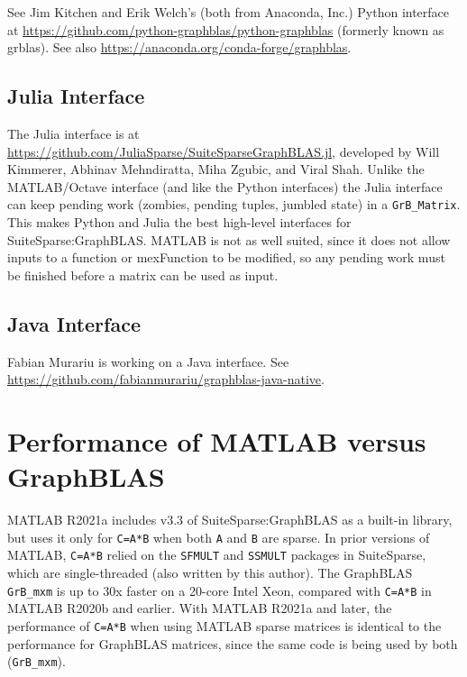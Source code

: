 \documentclass[12pt]{article}
\begin{document}
See Jim Kitchen and Erik Welch's (both from Anaconda, Inc.) Python interface at
\url{https://github.com/python-graphblas/python-graphblas} (formerly known as grblas).
See also \url{https://anaconda.org/conda-forge/graphblas}.

\subsection{Julia Interface}
\label{julia}

The Julia interface is at
\url{https://github.com/JuliaSparse/SuiteSparseGraphBLAS.jl}, developed by Will
Kimmerer, Abhinav Mehndiratta, Miha Zgubic, and Viral Shah.
Unlike the MATLAB/Octave interface (and like the Python interfaces) the Julia
interface can keep pending work (zombies, pending tuples, jumbled state) in
a \verb'GrB_Matrix'. This makes Python and Julia the best high-level interfaces
for SuiteSparse:GraphBLAS.  MATLAB is not as well suited, since it does not
allow inputs to a function or mexFunction to be modified, so any pending
work must be finished before a matrix can be used as input.

\subsection{Java Interface}
\label{java}

Fabian Murariu is working on a Java interface.
See \newline
\url{https://github.com/fabianmurariu/graphblas-java-native}.

\section{Performance of MATLAB versus GraphBLAS}
\label{matlab_performance}

MATLAB R2021a includes v3.3 of SuiteSparse:GraphBLAS as a built-in library, but
uses it only for \verb'C=A*B' when both \verb'A' and \verb'B' are sparse.  In
prior versions of MATLAB, \verb'C=A*B' relied on the \verb'SFMULT' and
\verb'SSMULT' packages in SuiteSparse, which are single-threaded (also written
by this author).  The GraphBLAS \verb'GrB_mxm' is up to 30x faster on a 20-core
Intel Xeon, compared with \verb'C=A*B' in MATLAB R2020b and earlier.  With
MATLAB R2021a and later, the performance of \verb'C=A*B' when using MATLAB
sparse matrices is identical to the performance for GraphBLAS matrices, since
the same code is being used by both (\verb'GrB_mxm').
\end{document}
